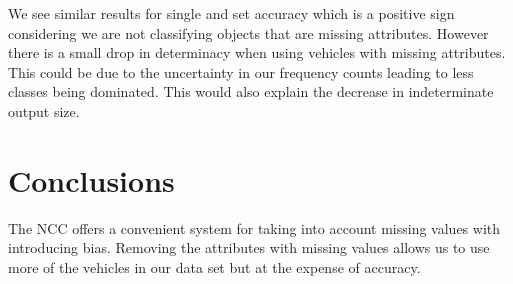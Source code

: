 We see similar results for single and set accuracy which is a positive sign considering we are not classifying objects that are missing attributes.
However there is a small drop in determinacy when using vehicles with missing attributes.
This could be due to the uncertainty in our frequency counts leading to less classes being dominated.
This would also explain the decrease in indeterminate output size.

\section{Conclusions}

The NCC offers a convenient system for taking into account missing values with introducing bias.
Removing the attributes with missing values allows us to use more of the vehicles in our data set but at the expense of accuracy.